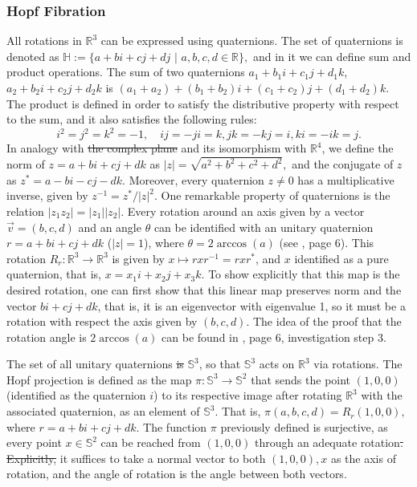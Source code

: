 \documentclass[12pt, letterpaper, reqno]{amsart}
\theoremstyle{definition}
\theoremstyle{plain}
\theoremstyle{remark}
\providecommand{\DIFadd}[1]{{\protect\color{blue}\uwave{#1}}} %
\providecommand{\DIFdel}[1]{{\protect\color{red}\sout{#1}}}                      %
\providecommand{\DIFaddbegin}{} %
\providecommand{\DIFaddend}{} %
\providecommand{\DIFdelbegin}{} %
\providecommand{\DIFdelend}{} %
\newcommand{\DIFscaledelfig}{0.5}
\newlength{\DIFdelgraphicswidth} %
\newlength{\DIFdelgraphicsheight} %
\newcommand{\DIFaddincludegraphics}[2][]{{\color{blue}\fbox{\DIFOincludegraphics[#1]{#2}}}} %
\newcommand{\DIFdelincludegraphics}[2][]{%
\sbox{\DIFdelgraphicsbox}{\DIFOincludegraphics[#1]{#2}}%
\settoboxwidth{\DIFdelgraphicswidth}{\DIFdelgraphicsbox} %
\settoboxtotalheight{\DIFdelgraphicsheight}{\DIFdelgraphicsbox} %
\scalebox{\DIFscaledelfig}{%
\parbox[b]{\DIFdelgraphicswidth}{\usebox{\DIFdelgraphicsbox}\\[-\baselineskip] \rule{\DIFdelgraphicswidth}{0em}}\llap{\resizebox{\DIFdelgraphicswidth}{\DIFdelgraphicsheight}{%
\setlength{\unitlength}{\DIFdelgraphicswidth}%
\begin{picture}(1,1)%
\thicklines\linethickness{2pt} %
{\color[rgb]{1,0,0}\put(0,0){\framebox(1,1){}}}%
{\color[rgb]{1,0,0}\put(0,0){\line( 1,1){1}}}%
{\color[rgb]{1,0,0}\put(0,1){\line(1,-1){1}}}%
\end{picture}%
}\hspace*{3pt}}} %
} %
\DeclareRobustCommand{\DIFaddbegin}{\DIFOaddbegin \let\includegraphics\DIFaddincludegraphics} %
\DeclareRobustCommand{\DIFaddend}{\DIFOaddend \let\includegraphics\DIFOincludegraphics} %
\DeclareRobustCommand{\DIFdelbegin}{\DIFOdelbegin \let\includegraphics\DIFdelincludegraphics} %
\DeclareRobustCommand{\DIFdelend}{\DIFOaddend \let\includegraphics\DIFOincludegraphics} %
\begin{document}
\subsubsection{Hopf Fibration}%
\label{ssub:hopf_fibration}

All rotations in $ \mathbb{R}^3 $ can be expressed using quaternions. The set of quaternions is denoted as $ \mathbb{H} := \{ a+bi+cj+dj$  $|$  $a,b,c,d\in \mathbb{R} \}, $ and in it we can define sum and product operations. The sum of two quaternions $ a_1+b_1 i +c_1 j  + d_1k $, $ a_2+b_2 i +c_2 j  + d_2k $ is $ (a_1+a_2)+(b_1+b_2)i+(c_1+c_2)j+(d_1+d_2)k. $ The product is defined in order to satisfy the distributive property with respect to the sum, and it also satisfies the following rules: 
$$ i^2=j^2=k^2=-1, \quad ij=-ji=k, jk=-kj=i, ki = -ik=j.  $$ 
In analogy with \DIFdelbegin \DIFdel{the complex plane }\DIFdelend \DIFaddbegin \DIFadd{$\mathbb{C}^2$ }\DIFaddend and its isomorphism with $\mathbb{R}^4$, we define the norm of $ z= a+bi+cj+dk $ as $ |z|=\sqrt{a^2+b^2+c^2+d^2}, $ and the conjugate of $ z $ as $ z^* = a-bi-cj-dk. $ Moreover, every quaternion $ z\neq 0 $ has a multiplicative inverse, given by $ z^{-1} = z^*/|z|^2. $ One remarkable property of quaternions is the relation $ |z_1 z_2| = |z_1||z_2|. $  Every rotation around an axis given by a vector $ \vec{v}=(b,c,d) $ and an angle $ \theta $ can be identified with an unitary quaternion $r = a+bi+cj+dk$ ($|z|=1$),  where $ \theta = 2\arccos(a) $ (see \cite{lyons2003elementary}, page 6). This rotation $ R_r: \mathbb{R}^3 \rightarrow\mathbb{R}^3 $ is given by $ x\mapsto rxr^{-1}= rxr^*$, and $ x $ identified as a pure quaternion, that is, $ x=x_1i+x_2j+x_3k. $ To show explicitly that this map is the desired rotation, one can first show that this linear map preserves norm and the vector $ bi+cj+dk $, that is, it is an eigenvector with eigenvalue 1, so it must be a rotation with respect the axis given by $ (b,c,d) $. The idea of the proof that the rotation angle is $ 2\arccos(a) $ can be found in \cite{lyons2003elementary}, page 6, investigation step 3. 

The set of all unitary quaternions \DIFdelbegin \DIFdel{is }\DIFdelend \DIFaddbegin \DIFadd{can be identified with }\DIFaddend $ \mathbb{S}^3 $, so that $ \mathbb{S}^3 $ acts on $ \mathbb{R}^3 $ via rotations. The Hopf projection is defined as the map $ \pi: \mathbb{S}^3 \rightarrow \mathbb{S}^2 $ that sends the point $ (1,0,0) $ (identified as the quaternion $ i $)   to its respective image after rotating $ \mathbb{R}^3 $ with the associated quaternion, as an element of $ \mathbb{S}^3 $. That is, $ \pi(a,b,c,d) = R_r(1,0,0), $ where $ r=a+bi+cj+dk. $  The function $ \pi $ previously defined is surjective, as every point $ x\in\mathbb{S}^2 $ can be reached from $ (1,0,0) $ through an adequate rotation\DIFdelbegin \DIFdel{. Explicitly, }\DIFdelend \DIFaddbegin \DIFadd{: }\DIFaddend it suffices to take a normal vector to both $ (1,0,0), x $ as the axis of rotation, and the angle of rotation is the angle between both vectors. 
\end{document}
